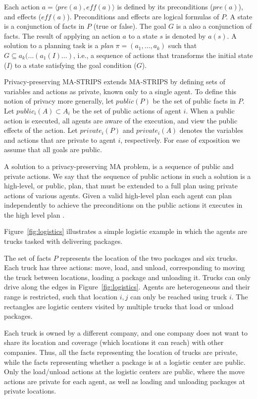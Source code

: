 \documentclass[letterpaper]{article}
\theoremstyle{definition}
\begin{document}
Each action $a=\langle pre(a), eff(a) \rangle$ is defined by its preconditions ($pre(a)$), and effects ($eff(a)$). Preconditions and effects are logical formulas of $P$. A state is a conjunction of facts in $P$ (true or false). The goal $G$ is a also a conjunction of facts. The result of applying an action $a$ to a state $s$ is denoted by $a(s)$. A solution to a planning task is a {\em plan} $\pi=(a_1,\ldots,a_k)$ such that $G\subseteq a_k(\ldots(a_1(I)\ldots)$, i.e., a sequence of actions that transforms the initial state ($I$) to a state satisfying the goal condition ($G$). 

Privacy-preserving MA-STRIPS extends MA-STRIPS by defining sets of variables and actions as private, known only to a single agent. To define this notion of privacy more generally, let $public(P)$ be the set of public facts in $P$. Let $public_i(A) \subset A_i$ be the set of public actions of agent $i$. When a public action is executed, all agents are aware of the execution, and view the public effects of the action.
Let $private_i(P)$ and $private_i(A)$ denotes the variables and actions that are private to agent $i$, respectively. For ease of exposition we assume that all goals are public.

A solution to a privacy-preserving MA problem, is a sequence of public and private actions. We say that the sequence of public actions in such a solution is a high-level, or public, plan, that must be extended to a full plan using private actions of various agents. Given a valid high-level plan each agent can plan independently to achieve the preconditions on the public actions it executes in the high level plan \citep{maliah2014privacyPreserving}.

Figure~\ref{fig:logistics} illustrates a simple logistic example in which the agents are trucks tasked with delivering packages. 

The set of facts $P$ represents the location of the two packages and six trucks. Each truck has three actions: move, load, and unload, corresponding to moving the truck between locations, loading a package and unloading it. Trucks can only drive along the edges in Figure~\ref{fig:logistics}. Agents are heterogeneous  and their range is restricted, such that location $i,j$ can only be reached using truck $i$. The rectangles are logistic centers visited by multiple trucks that load or unload packages. 

Each truck is owned by a different company, and one company does not want to share its location and coverage (which locations it can reach) with other companies. Thus, all the facts representing the location of trucks are private, while the facts representing whether a package is at a logistic center are public. Only the load/unload actions at the logistic centers are public, where the move actions are private for each agent, as well as loading and unloading packages at private locations.  
\end{document}
